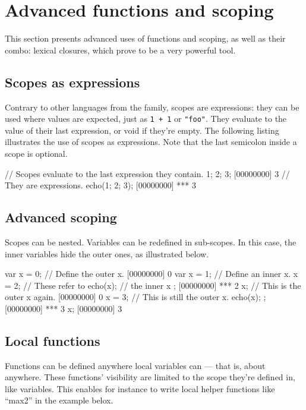 \chapter{Advanced functions and scoping}
\label{sec:tut:function}

This section presents advanced uses of functions and scoping, as well
as their combo: lexical closures, which prove to be a very powerful
tool.

\section{Scopes as expressions}

Contrary to other languages from the \C family, scopes are
expressions: they can be used where values are expected, just as
\lstinline|1 + 1| or \lstinline|"foo"|.
They evaluate to the value of their last expression, or void if they're
empty. The following listing illustrates the use of scopes as
expressions. Note that the last semicolon inside a scope is optional.

\begin{urbiscript}
// Scopes evaluate to the last expression they contain.
{ 1; 2; 3};
[00000000] 3
// They are expressions.
echo({1; 2; 3});
[00000000] *** 3
\end{urbiscript}

\section{Advanced scoping}

Scopes can be nested. Variables can be redefined in sub-scopes. In
this case, the inner variables hide the outer ones, as illustrated
below.

\begin{urbiscript}
var x = 0;   // Define the outer x.
[00000000] 0
{
  var x = 1; // Define an inner x.
  x = 2;     // These refer to
  echo(x);   // the inner x
};
[00000000] *** 2
x;           // This is the outer x again.
[00000000] 0
{
  x = 3;     // This is still the outer x.
  echo(x);
};
[00000000] *** 3
x;
[00000000] 3
\end{urbiscript}

\section{Local functions}

Functions can be defined anywhere local variables can --- that is,
about anywhere. These functions' visibility are limited to the scope
they're defined in, like variables. This enables for instance to write
local helper functions like ``max2'' in the example belox.

